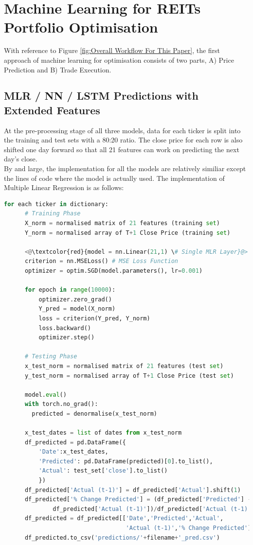 \documentclass[a4paper,12pt]{report}
\numberwithin{equation}{section}
\theoremstyle{definition}
\begin{document}

\section{Machine Learning for REITs Portfolio Optimisation}
With reference to Figure \ref{fig:Overall Workflow For This Paper}, the first approach of machine learning for optimisation consists of two parts, A) Price Prediction and B) Trade Execution.


\subsection{MLR / NN / LSTM Predictions with Extended Features}
At the pre-processing stage of all three models, data for each ticker is split into the training and test sets with a 80:20 ratio. The close price for each row is also shifted one day forward so that all 21 features can work on predicting the next day's close.  
\\

By and large, the implementation for all the models are relatively similiar except the lines of code where the model is actually used. The implementation of Multiple Linear Regression is as follows:
\begin{lstlisting}[language=Python, caption=Multiple Linear Regression Pseudocode, basicstyle=\footnotesize\ttfamily]
  for each ticker in dictionary:
      # Training Phase
      X_norm = normalised matrix of 21 features (training set)
      Y_norm = normalised array of T+1 Close Price (training set)
  
      <@\textcolor{red}{model = nn.Linear(21,1) \# Single MLR Layer}@>
      criterion = nn.MSELoss() # MSE Loss Function
      optimizer = optim.SGD(model.parameters(), lr=0.001)

      for epoch in range(10000):
          optimizer.zero_grad()
          Y_pred = model(X_norm)
          loss = criterion(Y_pred, Y_norm)
          loss.backward()
          optimizer.step()

      # Testing Phase
      x_test_norm = normalised matrix of 21 features (test set)
      y_test_norm = normalised array of T+1 Close Price (test set)

      model.eval()
      with torch.no_grad():
        predicted = denormalise(x_test_norm)

      x_test_dates = list of dates from x_test_norm
      df_predicted = pd.DataFrame({
          'Date':x_test_dates,
          'Predicted': pd.DataFrame(predicted)[0].to_list(),
          'Actual': test_set['close'].to_list()
          })
      df_predicted['Actual (t-1)'] = df_predicted['Actual'].shift(1)    
      df_predicted['% Change Predicted'] = (df_predicted['Predicted'] - 
              df_predicted['Actual (t-1)'])/df_predicted['Actual (t-1)']
      df_predicted = df_predicted[['Date','Predicted','Actual',
                                   'Actual (t-1)','% Change Predicted']]
      df_predicted.to_csv('predictions/'+filename+'_pred.csv')
  \end{lstlisting}
\end{document}
